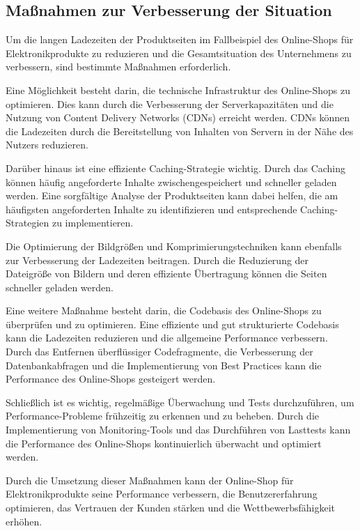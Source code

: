 \subsection{Maßnahmen zur Verbesserung der Situation}
Um die langen Ladezeiten der Produktseiten im Fallbeispiel des Online-Shops für Elektronikprodukte zu reduzieren und die Gesamtsituation des Unternehmens zu verbessern, sind bestimmte Maßnahmen erforderlich.

Eine Möglichkeit besteht darin, die technische Infrastruktur des Online-Shops zu optimieren. Dies kann durch die Verbesserung der Serverkapazitäten und die Nutzung von Content Delivery Networks (CDNs) erreicht werden. CDNs können die Ladezeiten durch die Bereitstellung von Inhalten von Servern in der Nähe des Nutzers reduzieren.

Darüber hinaus ist eine effiziente Caching-Strategie wichtig. Durch das Caching können häufig angeforderte Inhalte zwischengespeichert und schneller geladen werden. Eine sorgfältige Analyse der Produktseiten kann dabei helfen, die am häufigsten angeforderten Inhalte zu identifizieren und entsprechende Caching-Strategien zu implementieren.

Die Optimierung der Bildgrößen und Komprimierungstechniken kann ebenfalls zur Verbesserung der Ladezeiten beitragen. Durch die Reduzierung der Dateigröße von Bildern und deren effiziente Übertragung können die Seiten schneller geladen werden.

Eine weitere Maßnahme besteht darin, die Codebasis des Online-Shops zu überprüfen und zu optimieren. Eine effiziente und gut strukturierte Codebasis kann die Ladezeiten reduzieren und die allgemeine Performance verbessern. Durch das Entfernen überflüssiger Codefragmente, die Verbesserung der Datenbankabfragen und die Implementierung von Best Practices kann die Performance des Online-Shops gesteigert werden.

Schließlich ist es wichtig, regelmäßige Überwachung und Tests durchzuführen, um Performance-Probleme frühzeitig zu erkennen und zu beheben. Durch die Implementierung von Monitoring-Tools und das Durchführen von Lasttests kann die Performance des Online-Shops kontinuierlich überwacht und optimiert werden.

Durch die Umsetzung dieser Maßnahmen kann der Online-Shop für Elektronikprodukte seine Performance verbessern, die Benutzererfahrung optimieren, das Vertrauen der Kunden stärken und die Wettbewerbsfähigkeit erhöhen.